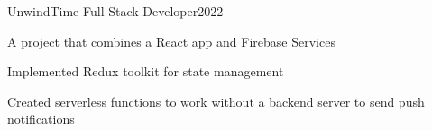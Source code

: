\resumeSubheading
  {UnwindTime}{}
  {Full Stack Developer}{2022}
  \vspace{\experienceItemSpacing}
  \resumeItemListStart
\item A project that combines a React app and Firebase Services
\item Implemented Redux toolkit for state management
\item Created serverless functions to work without a backend server to send push notifications
  \resumeItemListEnd 